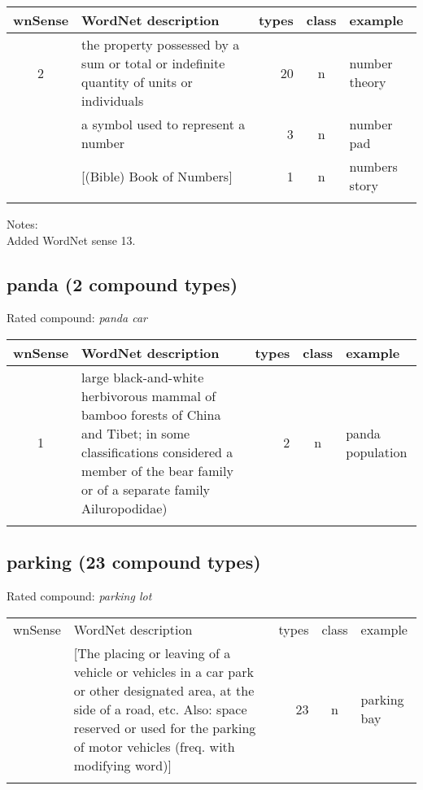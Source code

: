 \noindent
\begin{longtable}{c>{\raggedright\arraybackslash}p{5cm}rc>{\raggedright\arraybackslash}p{2cm}}\lsptoprule
{\small wnSense}&WordNet description&types&class&example\\\midrule
2&the property possessed by a sum or total or indefinite quantity of units or individuals&20&n&number theory\\\tablevspace
5&a symbol used to represent a number&3&n&number pad\\\tablevspace
13&{}[(Bible) Book of Numbers]&1&n&numbers story\\\lspbottomrule
\end{longtable}

\noindent
Notes:\\
Added WordNet sense 13.

\subsection{panda        (2 compound types)}
Rated compound: \emph{panda car}

\vspace*{1ex}

\noindent
\begin{longtable}{c>{\raggedright\arraybackslash}p{5cm}rc>{\raggedright\arraybackslash}p{2cm}}\lsptoprule
{\small wnSense}&WordNet description&types&class&example\\\midrule
1&large black-and-white herbivorous mammal of bamboo forests of China and Tibet; in some classifications considered a member of the bear family or of a separate family Ailuropodidae)&2&n&panda population\\\lspbottomrule
\end{longtable}

\subsection{parking      (23 compound types)}
Rated compound: \emph{parking lot}


\vspace*{1ex}

\noindent
\begin{longtable}{c>{\raggedright\arraybackslash}p{5cm}rc>{\raggedright\arraybackslash}p{2cm}}\lsptoprule
{\small wnSense}&WordNet description&types&class&example\\\tablevspace
1&{}[The placing or leaving of a vehicle or vehicles in a car park or
other designated area, at the side of a road, etc. Also: space reserved or used for the parking of motor vehicles (freq. with modifying word)]&23&n&parking bay\\\lspbottomrule
\end{longtable}

